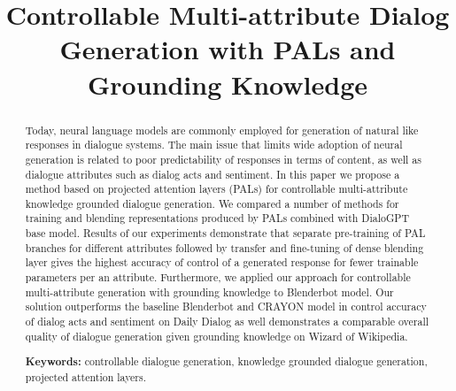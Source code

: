 \documentclass[11pt]{article}
\title{Controllable Multi-attribute Dialog Generation with PALs and Grounding Knowledge}
\date{}
\begin{document}
\maketitle
\begin{abstract}
Today, neural language models are commonly employed for generation of natural like responses in dialogue systems. The main issue that limits wide adoption of neural generation is related to poor predictability of responses in terms of content, as well as dialogue attributes such as dialog acts and sentiment.
In this paper we propose a method based on projected attention layers (PALs) for controllable multi-attribute knowledge grounded dialogue generation. We compared a number of methods for training and blending representations produced by PALs combined with DialoGPT base model. Results of our experiments demonstrate that separate pre-training of PAL branches for different attributes followed by transfer and fine-tuning of dense blending layer gives the highest accuracy of control of a generated response for fewer trainable parameters per an attribute. Furthermore, we applied our approach for controllable multi-attribute generation with grounding knowledge to Blenderbot model. Our solution outperforms the baseline Blenderbot and CRAYON model in control accuracy of dialog acts and sentiment on Daily Dialog as well demonstrates a comparable overall quality  of dialogue generation given grounding knowledge on Wizard of Wikipedia.
  
\textbf{Keywords:} controllable dialogue generation, knowledge grounded dialogue generation, projected attention layers.
\end{abstract}

\begin{center}

\end{center}
\end{document}
